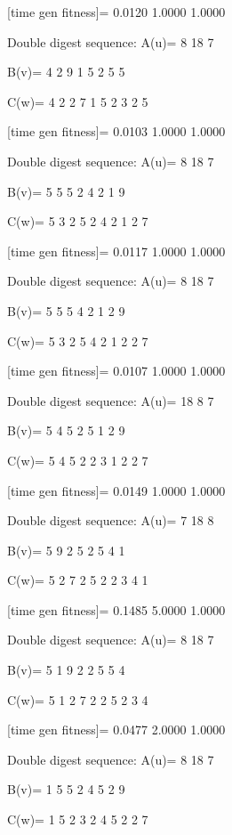 [time gen fitness]=
    0.0120    1.0000    1.0000

Double digest sequence:
A(u)=
     8    18     7

B(v)=
     4     2     9     1     5     2     5     5

C(w)=
     4     2     2     7     1     5     2     3     2     5

[time gen fitness]=
    0.0103    1.0000    1.0000

Double digest sequence:
A(u)=
     8    18     7

B(v)=
     5     5     5     2     4     2     1     9

C(w)=
     5     3     2     5     2     4     2     1     2     7

[time gen fitness]=
    0.0117    1.0000    1.0000

Double digest sequence:
A(u)=
     8    18     7

B(v)=
     5     5     5     4     2     1     2     9

C(w)=
     5     3     2     5     4     2     1     2     2     7

[time gen fitness]=
    0.0107    1.0000    1.0000

Double digest sequence:
A(u)=
    18     8     7

B(v)=
     5     4     5     2     5     1     2     9

C(w)=
     5     4     5     2     2     3     1     2     2     7

[time gen fitness]=
    0.0149    1.0000    1.0000

Double digest sequence:
A(u)=
     7    18     8

B(v)=
     5     9     2     5     2     5     4     1

C(w)=
     5     2     7     2     5     2     2     3     4     1

[time gen fitness]=
    0.1485    5.0000    1.0000

Double digest sequence:
A(u)=
     8    18     7

B(v)=
     5     1     9     2     2     5     5     4

C(w)=
     5     1     2     7     2     2     5     2     3     4

[time gen fitness]=
    0.0477    2.0000    1.0000

Double digest sequence:
A(u)=
     8    18     7

B(v)=
     1     5     5     2     4     5     2     9

C(w)=
     1     5     2     3     2     4     5     2     2     7

